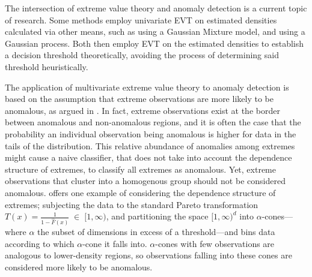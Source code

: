 The intersection of extreme value theory and anomaly detection is a current 
    topic of research.  Some methods employ univariate EVT on estimated 
    densities calculated via other means, such as \cite{clifton2011} using a 
    Gaussian Mixture model, and \cite{gu2021} using a Gaussian process.  Both 
    then employ EVT on the estimated densities to establish a decision 
    threshold theoretically, avoiding the process of determining said
    threshold heuristically.

The application of multivariate extreme value theory to anomaly detection is 
    based on the  assumption that extreme observations are more likely to be 
    anomalous, as argued in \cite{goix2017}. In fact, extreme observations 
    exist at the border between anomalous and non-anomalous regions, and it is 
    often the case that the probability an individual observation being 
    anomalous is higher for data in the tails of the distribution.
    This relative abundance of anomalies among extremes might cause a naive 
    classifier, that does not take into account the dependence structure of 
    extremes, to classify all extremes as anomalous. Yet, extreme observations 
    that cluster into a homogenous group should not be considered anomalous.
    \cite{goix2017} offers one example of considering the dependence structure 
    of extremes; subjecting the data to the standard Pareto transformation 
    $T(x) = \frac{1}{1 - \hat{F}(x)}\;\in\;[1,\infty)$, 
    and partitioning the space $[1,\infty)^d$ into $\alpha$-cones---where 
    $\alpha$ the subset of dimensions in excess of a threshold---and bins 
    data according to which $\alpha$-cone it falls into.  $\alpha$-cones with 
    few observations are analogous to lower-density regions, so observations 
    falling into these cones are considered more likely to be anomalous.

